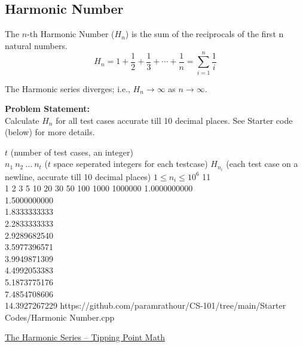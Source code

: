 \subsection{Harmonic Number}{\label{pp:harmonic}}
The $n$-th Harmonic Number ($H_n$) is the sum of the reciprocals of the first n natural numbers.
\begin{equation}
{H_{n}=1+{\frac {1}{2}}+{\frac {1}{3}}+\cdots +{\frac {1}{n}}=\sum _{i=1}^{n}{\frac {1}{i}}}
\end{equation}
\begin{fact}
The Harmonic series diverges; i.e., $H_n \rightarrow\infty$ as $n\rightarrow\infty$.
\end{fact}
\textbf{Problem Statement:}\\
Calculate $H_n$ for all test cases accurate till 10 decimal places. See Starter code (below) for more details.
\begin{testcases}
	{$t$ \hfill(number of test cases, an integer)\\
	$n_1\ n_2\ \ldots\ n_t$ \hfill($t$ space seperated integers for each testcase)}
	{$H_{n_i}$ \hfill(each test case on a newline, accurate till 10 decimal places)}
	{$1 \leq n_i \leq 10^{6}$}
	{11\\1 2 3 5 10 20 30 50 100 1000 1000000}
	{1.0000000000\\1.5000000000\\1.8333333333\\2.2833333333\\2.9289682540\\3.5977396571\\3.9949871309\\4.4992053383\\5.1873775176\\7.4854708606\\14.3927267229}
	{https://github.com/paramrathour/CS-101/tree/main/Starter Codes/Harmonic Number.cpp}
\end{testcases}
\begin{funvideo}
\href{https://youtu.be/Dgcoa2yAUfw}{The Harmonic Series -- Tipping Point Math}
\end{funvideo}
